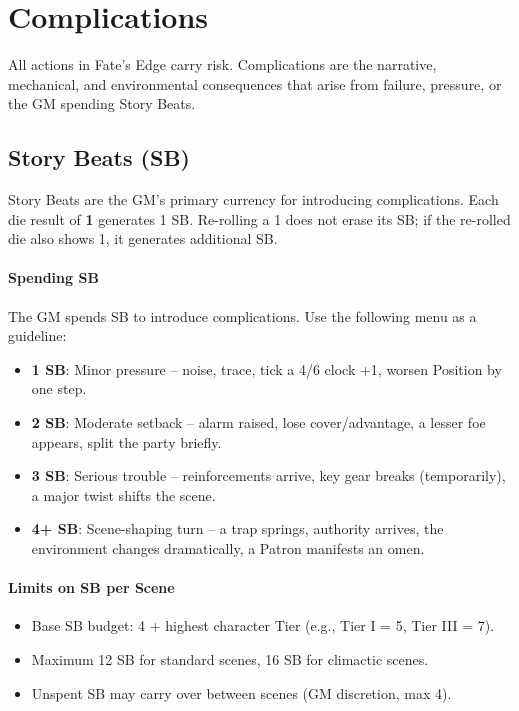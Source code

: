 \section{Complications}

All actions in Fate's Edge carry risk. Complications are the narrative, mechanical, and environmental consequences that arise from failure, pressure, or the GM spending Story Beats.

\subsection{Story Beats (SB)}
Story Beats are the GM's primary currency for introducing complications. Each die result of \textbf{1} generates 1 SB. Re-rolling a 1 does not erase its SB; if the re-rolled die also shows 1, it generates additional SB.

\paragraph{Spending SB}
The GM spends SB to introduce complications. Use the following menu as a guideline:
\begin{itemize}
  \item \textbf{1 SB}: Minor pressure -- noise, trace, tick a 4/6 clock +1, worsen Position by one step.
  \item \textbf{2 SB}: Moderate setback -- alarm raised, lose cover/advantage, a lesser foe appears, split the party briefly.
  \item \textbf{3 SB}: Serious trouble -- reinforcements arrive, key gear breaks (temporarily), a major twist shifts the scene.
  \item \textbf{4+ SB}: Scene-shaping turn -- a trap springs, authority arrives, the environment changes dramatically, a Patron manifests an omen.
\end{itemize}

\paragraph{Limits on SB per Scene}
\begin{itemize}
  \item Base SB budget: 4 + highest character Tier (e.g., Tier I = 5, Tier III = 7).
  \item Maximum 12 SB for standard scenes, 16 SB for climactic scenes.
  \item Unspent SB may carry over between scenes (GM discretion, max 4).
\end{itemize}

